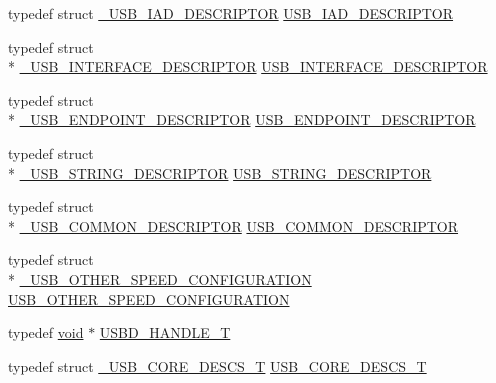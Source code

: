 \begin{DoxyCompactItemize}
\item 
typedef struct \hyperlink{struct__USB__IAD__DESCRIPTOR}{\-\_\-\-U\-S\-B\-\_\-\-I\-A\-D\-\_\-\-D\-E\-S\-C\-R\-I\-P\-T\-O\-R} \hyperlink{group__USBD__Core_ga6b053e842151d5c5dcdace597e45a36b}{U\-S\-B\-\_\-\-I\-A\-D\-\_\-\-D\-E\-S\-C\-R\-I\-P\-T\-O\-R}
\item 
typedef struct \\*
\hyperlink{struct__USB__INTERFACE__DESCRIPTOR}{\-\_\-\-U\-S\-B\-\_\-\-I\-N\-T\-E\-R\-F\-A\-C\-E\-\_\-\-D\-E\-S\-C\-R\-I\-P\-T\-O\-R} \hyperlink{group__USBD__Core_gac933513ce6cbf852d0dc998bd8fb333d}{U\-S\-B\-\_\-\-I\-N\-T\-E\-R\-F\-A\-C\-E\-\_\-\-D\-E\-S\-C\-R\-I\-P\-T\-O\-R}
\item 
typedef struct \\*
\hyperlink{struct__USB__ENDPOINT__DESCRIPTOR}{\-\_\-\-U\-S\-B\-\_\-\-E\-N\-D\-P\-O\-I\-N\-T\-\_\-\-D\-E\-S\-C\-R\-I\-P\-T\-O\-R} \hyperlink{group__USBD__Core_ga652b2871268bd903653cbff0f3448a6e}{U\-S\-B\-\_\-\-E\-N\-D\-P\-O\-I\-N\-T\-\_\-\-D\-E\-S\-C\-R\-I\-P\-T\-O\-R}
\item 
typedef struct \\*
\hyperlink{struct__USB__STRING__DESCRIPTOR}{\-\_\-\-U\-S\-B\-\_\-\-S\-T\-R\-I\-N\-G\-\_\-\-D\-E\-S\-C\-R\-I\-P\-T\-O\-R} \hyperlink{group__USBD__Core_gabccfa24c1955b99a76219a89b8e6f3b6}{U\-S\-B\-\_\-\-S\-T\-R\-I\-N\-G\-\_\-\-D\-E\-S\-C\-R\-I\-P\-T\-O\-R}
\item 
typedef struct \\*
\hyperlink{struct__USB__COMMON__DESCRIPTOR}{\-\_\-\-U\-S\-B\-\_\-\-C\-O\-M\-M\-O\-N\-\_\-\-D\-E\-S\-C\-R\-I\-P\-T\-O\-R} \hyperlink{group__USBD__Core_gae20aa0e1d1e5418dbef678b53b2c3ebe}{U\-S\-B\-\_\-\-C\-O\-M\-M\-O\-N\-\_\-\-D\-E\-S\-C\-R\-I\-P\-T\-O\-R}
\item 
typedef struct \\*
\hyperlink{struct__USB__OTHER__SPEED__CONFIGURATION}{\-\_\-\-U\-S\-B\-\_\-\-O\-T\-H\-E\-R\-\_\-\-S\-P\-E\-E\-D\-\_\-\-C\-O\-N\-F\-I\-G\-U\-R\-A\-T\-I\-O\-N} \hyperlink{group__USBD__Core_ga808d47bcf11e648d95efc88e330fabc5}{U\-S\-B\-\_\-\-O\-T\-H\-E\-R\-\_\-\-S\-P\-E\-E\-D\-\_\-\-C\-O\-N\-F\-I\-G\-U\-R\-A\-T\-I\-O\-N}
\item 
typedef \hyperlink{Paradigm_2Tern__EE_2small_2portmacro_8h_a14d32f8130d3c0b212cfc751730b5b49}{void} $\ast$ \hyperlink{group__USBD__Core_gafdbb2204d929cb9d75736bd2b42342ac}{U\-S\-B\-D\-\_\-\-H\-A\-N\-D\-L\-E\-\_\-\-T}
\item 
typedef struct \hyperlink{struct__USB__CORE__DESCS__T}{\-\_\-\-U\-S\-B\-\_\-\-C\-O\-R\-E\-\_\-\-D\-E\-S\-C\-S\-\_\-\-T} \hyperlink{group__USBD__Core_gabdc617d119eac0555f91bea957c41ecc}{U\-S\-B\-\_\-\-C\-O\-R\-E\-\_\-\-D\-E\-S\-C\-S\-\_\-\-T}

\end{DoxyCompactItemize}

